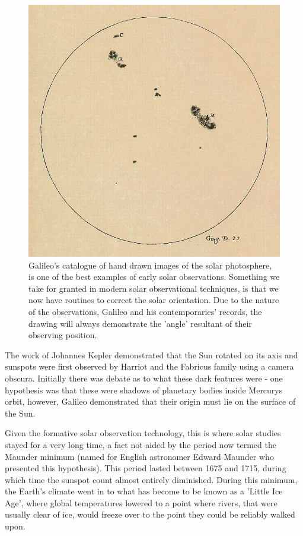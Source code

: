 \begin{figure}
	\includegraphics[width=\linewidth]{Chapter1/Figs/galileosunspot}
	\caption{Galileo's catalogue of hand drawn images of the solar photosphere, is one of the best examples of early solar observations. 
			Something we take for granted in modern solar observational techniques, is that we now have routines to correct the solar orientation.
			Due to the nature of the observations, Galileo and his contemporaries' records, the drawing will always demonstrate the 'angle' resultant of their observing position.}
	\label{fig:gali_sp}
\end{figure}

The work of Johannes Kepler demonstrated that the Sun rotated on its axis and sunspots were first observed by Harriot and the Fabricus family using a camera obscura. 
Initially there was debate as to what these dark features were - one hypothesis was that these were shadows of planetary bodies inside Mercurys orbit, however, Galileo demonstrated that their origin must lie on the surface of the Sun.

Given the formative solar observation technology, this is where solar studies stayed for a very long time, a fact not aided by the period now termed the Maunder minimum (named for English astronomer Edward Maunder who presented this hypothesis).
This period lasted between 1675 and 1715, during which time the sunspot count almost entirely diminished.
During this minimum, the Earth's climate went in to what has become to be known as a 'Little Ice Age', where global temperatures lowered to a point where rivers, that were usually clear of ice, would freeze over to the point they could be reliably walked upon. %

